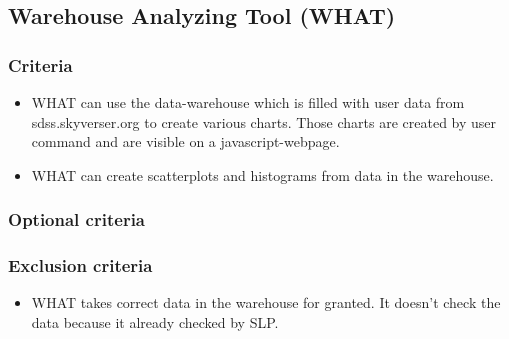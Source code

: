 \subsection{Warehouse Analyzing Tool (WHAT)}

\subsubsection{Criteria}
\begin{itemize}
\item WHAT can use the data-warehouse which is filled with user data  
from sdss.skyverser.org to create various charts. 
Those charts are created by user command and are visible on a javascript-webpage.
\item WHAT can create scatterplots and histograms from data in the warehouse.
\end{itemize}

\subsubsection{Optional criteria}

\subsubsection{Exclusion criteria}
\begin{itemize}
\item WHAT takes correct data in the warehouse for granted. It doesn't check the
 data because it already checked by SLP. 
\end{itemize}
